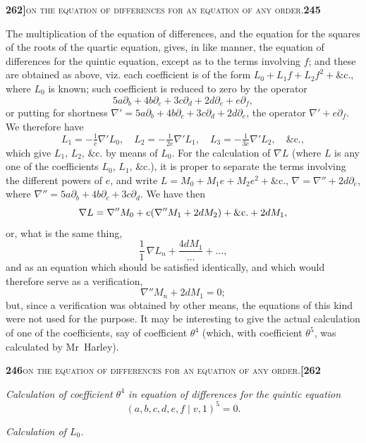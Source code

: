 \documentclass[11pt]{article}
\newcommand{\Cdel}{\mid}
\begin{document}
\newpage
\noindent\textbf{262]}\hfill\textsc{on the equation of differences for an equation of any order.}\hfill\textbf{245}

\medskip

\noindent The multiplication of the equation of differences, and the equation for the squares of the roots of the quartic equation, gives, in like manner, the equation of differences for the quintic equation, except as to the terms involving $f$; and these are obtained as above, viz. each coefficient is of the form $L_0 + L_1 f + L_2 f^2 + \&\text{c.}$, where $L_0$ is known; such coefficient is reduced to zero by the operator
\[
  5a\partial_b + 4b\partial_c + 3c\partial_d + 2d\partial_e + e\partial_f,
\]
or putting for shortness $\nabla' = 5a\partial_b + 4b\partial_c + 3c\partial_d + 2d\partial_e$, the operator $\nabla' + e\partial_f$. We therefore have
\[
  L_1 = -\tfrac{1}{e}\nabla' L_0,\quad L_2 = -\tfrac{1}{2e}\nabla' L_1,\quad L_3 = -\tfrac{1}{3e}\nabla' L_2,\quad \&\text{c.},
\]
which give $L_1$, $L_2$, \&c. by means of $L_0$. For the calculation of $\nabla L$ (where $L$ is any one of the coefficients $L_0$, $L_1$, \&c.), it is proper to separate the terms involving the different powers of $e$, and write $L = M_0 + M_1 e + M_2 e^2 + \&\text{c.}$, $\nabla = \nabla'' + 2d\partial_e$, where $\nabla'' = 5a\partial_b + 4b\partial_c + 3c\partial_d$. We have then
\[
  \nabla L = \nabla'' M_0 + e(\nabla'' M_1 + 2 d M_2) + \&\text{c.}\\
            + 2 d M_1,
\]
or, what is the same thing,
\[
  \frac{1}{1}\,\nabla L_n + \frac{4 d M_1}{\ldots} + \ldots,
\]
and as an equation which should be satisfied identically, and which would therefore serve as a verification,
\[
  \nabla'' M_n + 2 d M_1 = 0;
\]
but, since a verification was obtained by other means, the equations of this kind were not used for the purpose. It may be interesting to give the actual calculation of one of the coefficients, say of coefficient $\theta^4$ (which, with coefficient $\theta^5$, was calculated by Mr~Harley).

\newpage
\noindent\textbf{246}\hfill\textsc{on the equation of differences for an equation of any order.}\hfill\textbf{[262}

\medskip

\noindent\textit{Calculation of coefficient $\theta^4$ in equation of differences for the quintic equation}
\[
  (a, b, c, d, e, f \Cdel v, 1)^5 = 0.
\]

\medskip

\noindent\textit{Calculation of $L_0$.}
\end{document}
